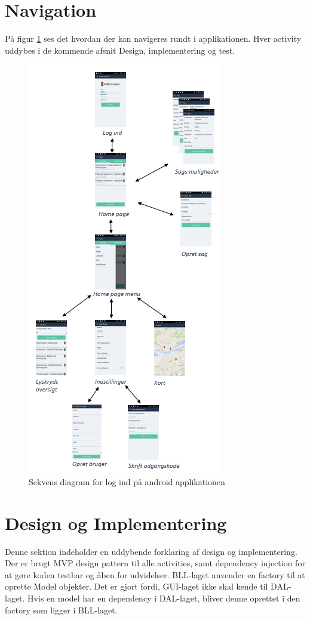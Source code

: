 	\section{Navigation}
	På figur \ref{fig:Navigation i applikationen} ses det hvordan der kan navigeres rundt i applikationen. Hver activity uddybes i de kommende afsnit Design, implementering og test.
	\begin{figure} [!ht]
		\begin{center}
			\includegraphics[scale=1.6]{Android/Billeder/Navigation}
		\end{center}
		\caption{Sekvens diagram for log ind på android applikationen}
		\label{fig:Navigation i applikationen}
	\end{figure}
	\pagebreak
	
	\section{Design og Implementering} \label{sec:designandroid}
	Denne sektion indeholder en uddybende forklaring af design og implementering.
	Der er brugt MVP design pattern til alle activities, samt dependency injection for at gøre koden testbar og åben for udvidelser. BLL-laget anvender en factory til at oprette Model objekter. Det er gjort fordi, GUI-laget ikke skal kende til DAL-laget. Hvis en model har en dependency i DAL-laget, bliver denne oprettet i den factory som ligger i BLL-laget.
	
